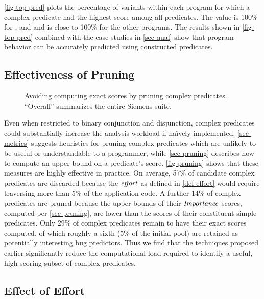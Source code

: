 \autoref{fig-top-pred} plots the percentage of variants within each program for which a complex predicate had the highest score among all predicates.  The value is 100\% for ,  and  and is close to 100\% for the other programs.  The results shown in \autoref{fig-top-pred} combined with the case studies in \autoref{sec-qual} show that program behavior can be accurately predicted using constructed predicates.

\subsection{Effectiveness of Pruning}
\label{sec-effectprune}
\begin{figure}
  \centering
  \hfill
  \caption{Avoiding computing exact scores by pruning complex predicates.  ``Overall'' summarizes the entire Siemens suite.}
  \label{fig-pruning}
\end{figure}

Even when restricted to binary conjunction and disjunction, complex predicates could substantially increase the analysis workload if na\"ively implemented.  \autoref{sec-metrics} suggests heuristics for pruning complex predicates which are unlikely to be useful or understandable to a programmer, while \autoref{sec-pruning} describes how to compute an upper bound on a predicate's score.  \autoref{fig-pruning} shows that these measures are highly effective in practice.  On average, 57\% of candidate complex predicates are discarded because the $\mathit{effort}$ as defined in \autoref{def-effort} would require traversing more than 5\% of the application code.  A further 14\% of complex predicates are pruned because the upper bounds of their $\mathit{Importance}$ scores, computed per \autoref{sec-pruning}, are lower than the scores of their constituent simple predicates.  Only 29\% of complex predicates remain to have their exact scores computed, of which roughly a sixth (5\% of the initial pool) are retained as potentially interesting bug predictors.  Thus we find that the techniques proposed earlier significantly reduce the computational load required to identify a useful, high-scoring subset of complex predicates.

\subsection{Effect of Effort}

